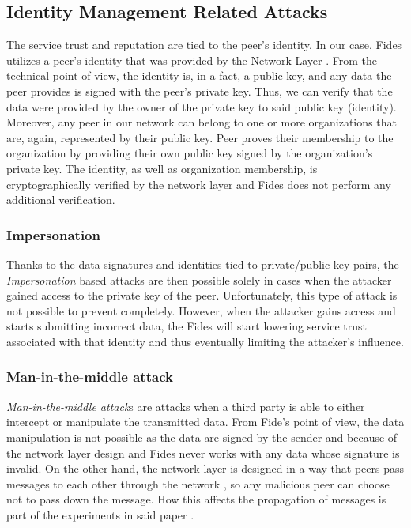 \subsection{Identity Management Related Attacks}
\label{subsec:identity-management-attacks}
The service trust and reputation are tied to the peer's identity. 
In our case, Fides utilizes a peer's identity that was provided by the Network Layer \cite{nl}.
From the technical point of view, the identity is, in a fact, a public key, and any data the peer provides is signed with the peer's private key. Thus, we can verify that the data were provided by the owner of the private key to said public key (identity).
Moreover, any peer in our network can belong to one or more organizations that are, again, represented by their public key. 
Peer proves their membership to the organization by providing their own public key signed by the organization's private key.
The identity, as well as organization membership, is cryptographically verified by the network layer \cite{nl} and Fides does not perform any additional verification. 

\subsubsection{Impersonation}
Thanks to the data signatures and identities tied to private/public key pairs, the \textit{Impersonation} based attacks are then possible solely in cases when the attacker gained access to the private key of the peer.
Unfortunately, this type of attack is not possible to prevent completely. 
However, when the attacker gains access and starts submitting incorrect data, the Fides will start lowering service trust associated with that identity and thus eventually limiting the attacker's influence.

\subsubsection{Man-in-the-middle attack}
\textit{Man-in-the-middle attack}s are attacks when a third party is able to either intercept or manipulate the transmitted data.
From Fide's point of view, the data manipulation is not possible as the data are signed by the sender and because of the network layer \cite{nl} design and Fides never works with any data whose signature is invalid.
On the other hand, the network layer is designed in a way that peers pass messages to each other through the network \cite{nl}, so any malicious peer can choose not to pass down the message.
How this affects the propagation of messages is part of the experiments in said paper \cite{nl}.

